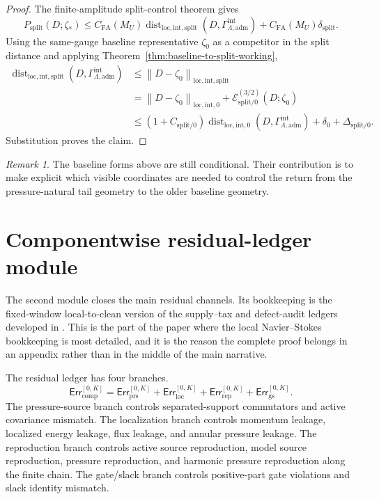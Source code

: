 \documentclass[11pt]{article}
\numberwithin{equation}{section}
\theoremstyle{definition}
\theoremstyle{remark}
\newtheorem{remark}[remark]{Remark}
\DeclareMathOperator{\dist}{dist}
\newcommand{\loc}{\mathrm{loc}}
\newcommand{\intg}{\mathrm{int}}
\newcommand{\spl}{\mathrm{split}}
\newcommand{\adm}{\mathrm{adm}}
\newcommand{\prs}{\mathrm{prs}}
\newcommand{\rep}{\mathrm{rep}}
\newcommand{\gs}{\mathrm{gs}}
\newcommand{\locerr}{\mathrm{loc}}
\newcommand{\comp}{\mathrm{comp}}
\newcommand{\norm}[2]{\left\|#1\right\|_{#2}}
\newcommand{\Err}{\mathsf{Err}}
\newcommand{\calE}{\mathcal E}
\newcommand{\Gammaadm}{\Gamma^{\intg}_{\Lambda,\adm}}
\begin{document}
\begin{proof}
The finite-amplitude split-control theorem gives
\[
    P_{\spl}(D;\zeta_*)
    \le
    C_{\mathrm{FA}}(M_U)
    \dist_{\loc,\intg,\spl}(D,\Gammaadm)
    +
    C_{\mathrm{FA}}(M_U)\delta_{\spl}.
\]
Using the same-gauge baseline representative \(\zeta_0\) as a competitor in the
split distance and applying Theorem~\ref{thm:baseline-to-split-working},
\[
\begin{aligned}
    \dist_{\loc,\intg,\spl}(D,\Gammaadm)
    &\le
    \norm{D-\zeta_0}{\loc,\intg,\spl}
\\
    &=
    \norm{D-\zeta_0}{\loc,\intg,0}
    +
    \calE_{\spl/0}^{(3/2)}(D;\zeta_0)
\\
    &\le
    (1+C_{\spl/0})
    \dist_{\loc,\intg,0}(D,\Gammaadm)
    +
    \delta_0
    +
    \Delta_{\spl/0}.
\end{aligned}
\]
Substitution proves the claim.
\end{proof}

\begin{remark}
The baseline forms above are still conditional.  Their contribution is to make
explicit which visible coordinates are needed to control the return from the
pressure-natural tail geometry to the older baseline geometry.
\end{remark}



\section{Componentwise residual-ledger module}\label{sec:ledger-module-main}

The second module closes the main residual channels.  Its bookkeeping is the fixed-window local-to-clean version of the supply--tax and defect-audit ledgers developed in \cite{YuCriticalLedgers2026,YuSingularityAuditTransfer2026}.  This is the part of the paper where the local Navier--Stokes bookkeeping is most detailed, and it is the reason the complete proof belongs in an appendix rather than in the middle of the main narrative.

The residual ledger has four branches.
\[
\boxed{
\Err_{\comp}^{[0,K]}
=
\Err_{\prs}^{[0,K]}
+
\Err_{\locerr}^{[0,K]}
+
\Err_{\rep}^{[0,K]}
+
\Err_{\gs}^{[0,K]}.}
\]
The pressure-source branch controls separated-support commutators and active covariance mismatch.  The localization branch controls momentum leakage, localized energy leakage, flux leakage, and annular pressure leakage.  The reproduction branch controls active source reproduction, model source reproduction, pressure reproduction, and harmonic pressure reproduction along the finite chain.  The gate/slack branch controls positive-part gate violations and slack identity mismatch.
\end{document}
